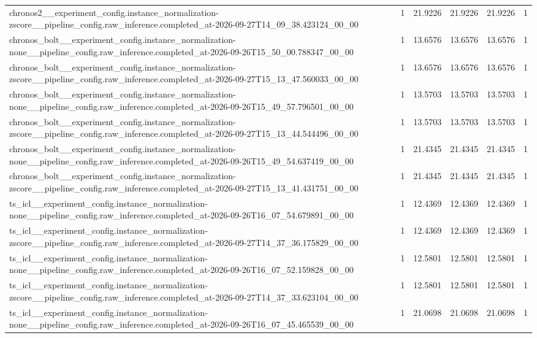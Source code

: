 \begin{tabular}{llllll}
chronos2\_\_experiment\_config.instance\_normalization-zscore\_\_pipeline\_config.raw\_inference.completed\_at-2026-09-27T14\_09\_38.423124\_00\_00 & 1 & 21.9226 & 21.9226 & 21.9226 & 1 \\
chronos\_bolt\_\_experiment\_config.instance\_normalization-none\_\_pipeline\_config.raw\_inference.completed\_at-2026-09-26T15\_50\_00.788347\_00\_00 & 1 & 13.6576 & 13.6576 & 13.6576 & 1 \\
chronos\_bolt\_\_experiment\_config.instance\_normalization-zscore\_\_pipeline\_config.raw\_inference.completed\_at-2026-09-27T15\_13\_47.560033\_00\_00 & 1 & 13.6576 & 13.6576 & 13.6576 & 1 \\
chronos\_bolt\_\_experiment\_config.instance\_normalization-none\_\_pipeline\_config.raw\_inference.completed\_at-2026-09-26T15\_49\_57.796501\_00\_00 & 1 & 13.5703 & 13.5703 & 13.5703 & 1 \\
chronos\_bolt\_\_experiment\_config.instance\_normalization-zscore\_\_pipeline\_config.raw\_inference.completed\_at-2026-09-27T15\_13\_44.544496\_00\_00 & 1 & 13.5703 & 13.5703 & 13.5703 & 1 \\
chronos\_bolt\_\_experiment\_config.instance\_normalization-none\_\_pipeline\_config.raw\_inference.completed\_at-2026-09-26T15\_49\_54.637419\_00\_00 & 1 & 21.4345 & 21.4345 & 21.4345 & 1 \\
chronos\_bolt\_\_experiment\_config.instance\_normalization-zscore\_\_pipeline\_config.raw\_inference.completed\_at-2026-09-27T15\_13\_41.431751\_00\_00 & 1 & 21.4345 & 21.4345 & 21.4345 & 1 \\
ts\_icl\_\_experiment\_config.instance\_normalization-none\_\_pipeline\_config.raw\_inference.completed\_at-2026-09-26T16\_07\_54.679891\_00\_00 & 1 & 12.4369 & 12.4369 & 12.4369 & 1 \\
ts\_icl\_\_experiment\_config.instance\_normalization-zscore\_\_pipeline\_config.raw\_inference.completed\_at-2026-09-27T14\_37\_36.175829\_00\_00 & 1 & 12.4369 & 12.4369 & 12.4369 & 1 \\
ts\_icl\_\_experiment\_config.instance\_normalization-none\_\_pipeline\_config.raw\_inference.completed\_at-2026-09-26T16\_07\_52.159828\_00\_00 & 1 & 12.5801 & 12.5801 & 12.5801 & 1 \\
ts\_icl\_\_experiment\_config.instance\_normalization-zscore\_\_pipeline\_config.raw\_inference.completed\_at-2026-09-27T14\_37\_33.623104\_00\_00 & 1 & 12.5801 & 12.5801 & 12.5801 & 1 \\
ts\_icl\_\_experiment\_config.instance\_normalization-none\_\_pipeline\_config.raw\_inference.completed\_at-2026-09-26T16\_07\_45.465539\_00\_00 & 1 & 21.0698 & 21.0698 & 21.0698 & 1 \\

\end{tabular}
